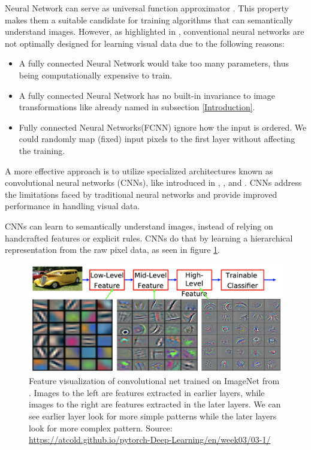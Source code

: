Neural Network can serve as universal function approximator \citep{HORNIK1989359}.
This property makes them a suitable candidate for training algorithms that can semantically understand images.
However, as highlighted in \citep{CNNLeCunDocumentRecog}, conventional neural networks are not optimally designed for learning visual data due to the following reasons:
\begin{itemize}
    \item A fully connected Neural Network would take too many parameters, thus being computationally expensive to train.
    \item A fully connected Neural Network has no built-in invariance to image transformations like already named in subsection \ref{Introduction}.
    \item Fully connected Neural Networks(FCNN) ignore how the input is ordered. We could randomly map (fixed) input pixels to the first layer without affecting the training.
\end{itemize}
A more effective approach is to utilize specialized architectures known as convolutional neural networks (CNNs), like introduced in \citep{rumelhart1985learning}, \citep{CNNLeCunHandwrittenDigits}, \citep{CNNLeCunDocumentRecog} and \citep{NIPS2012_c399862d}. CNNs address the limitations faced by traditional neural networks and provide improved performance in handling visual data.

CNNs can learn to semantically understand images, instead of relying on handcrafted features or explicit rules.
CNNs do that by learning a hierarchical representation from the raw pixel data, as seen in figure \ref{fig:cnn_features}.

\begin{figure}[h]
    \centering
    \includegraphics[width=1\textwidth]{figures/cnn_features.png}
    \caption{Feature visualization of convolutional net trained on ImageNet from \citep{zeiler2014visualizing}.
    Images to the left are features extracted in earlier layers, while images to the right are features extracted in the later layers.
    We can see earlier layer look for more simple patterns while the later layers look for more complex pattern.
    Source: \url{https://atcold.github.io/pytorch-Deep-Learning/en/week03/03-1/}}
    \label{fig:cnn_features}
\end{figure}

